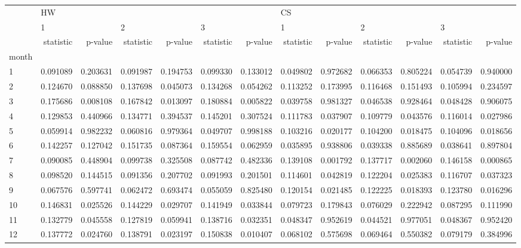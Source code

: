 \begin{tabular}{lrrrrrrrrrrrr}
\toprule
{} & \multicolumn{6}{l}{HW} & \multicolumn{6}{l}{CS} \\
{} & \multicolumn{2}{l}{1} & \multicolumn{2}{l}{2} & \multicolumn{2}{l}{3} & \multicolumn{2}{l}{1} & \multicolumn{2}{l}{2} & \multicolumn{2}{l}{3} \\
{} & statistic &   p-value & statistic &   p-value & statistic &   p-value & statistic &   p-value & statistic &   p-value & statistic &   p-value \\
month &           &           &           &           &           &           &           &           &           &           &           &           \\
\midrule
1     &  0.091089 &  0.203631 &  0.091987 &  0.194753 &  0.099330 &  0.133012 &  0.049802 &  0.972682 &  0.066353 &  0.805224 &  0.054739 &  0.940000 \\
2     &  0.124670 &  0.088850 &  0.137698 &  0.045073 &  0.134268 &  0.054262 &  0.113252 &  0.173995 &  0.116468 &  0.151493 &  0.105994 &  0.234597 \\
3     &  0.175686 &  0.008108 &  0.167842 &  0.013097 &  0.180884 &  0.005822 &  0.039758 &  0.981327 &  0.046538 &  0.928464 &  0.048428 &  0.906075 \\
4     &  0.129853 &  0.440966 &  0.134771 &  0.394537 &  0.145201 &  0.307524 &  0.111783 &  0.037907 &  0.109779 &  0.043576 &  0.116014 &  0.027986 \\
5     &  0.059914 &  0.982232 &  0.060816 &  0.979364 &  0.049707 &  0.998188 &  0.103216 &  0.020177 &  0.104200 &  0.018475 &  0.104096 &  0.018656 \\
6     &  0.142257 &  0.127042 &  0.151735 &  0.087364 &  0.159554 &  0.062959 &  0.035895 &  0.938806 &  0.039338 &  0.885689 &  0.038641 &  0.897804 \\
7     &  0.090085 &  0.448904 &  0.099738 &  0.325508 &  0.087742 &  0.482336 &  0.139108 &  0.001792 &  0.137717 &  0.002060 &  0.146158 &  0.000865 \\
8     &  0.098520 &  0.144515 &  0.091356 &  0.207702 &  0.091993 &  0.201501 &  0.114601 &  0.042819 &  0.122204 &  0.025383 &  0.116707 &  0.037323 \\
9     &  0.067576 &  0.597741 &  0.062472 &  0.693474 &  0.055059 &  0.825480 &  0.120154 &  0.021485 &  0.122225 &  0.018393 &  0.123780 &  0.016296 \\
10    &  0.146831 &  0.025526 &  0.144229 &  0.029707 &  0.141949 &  0.033844 &  0.079723 &  0.179843 &  0.076029 &  0.222942 &  0.087295 &  0.111990 \\
11    &  0.132779 &  0.045558 &  0.127819 &  0.059941 &  0.138716 &  0.032351 &  0.048347 &  0.952619 &  0.044521 &  0.977051 &  0.048367 &  0.952420 \\
12    &  0.137772 &  0.024760 &  0.138791 &  0.023197 &  0.150838 &  0.010407 &  0.068102 &  0.575698 &  0.069464 &  0.550382 &  0.079179 &  0.384996 \\
\bottomrule
\end{tabular}
